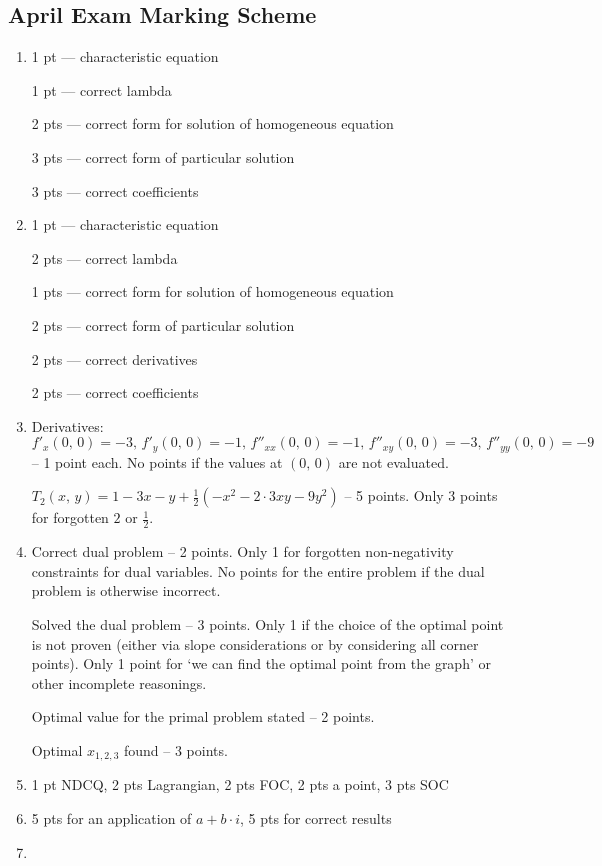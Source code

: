 \subsection{April Exam Marking Scheme}
\begin{enumerate}
  \item %
  1 pt — characteristic equation

  1 pt — correct lambda

  2 pts — correct form for solution of homogeneous equation

  3 pts — correct form of particular solution

  3 pts — correct coefficients 
  \item %
  1 pt — characteristic equation

  2 pts — correct lambda 

  1 pts — correct form for solution of homogeneous equation

  2 pts — correct form of particular solution

  2 pts — correct derivatives
  
  2 pts — correct coefficients
  \item %
      Derivatives: $f'_x(0,\,0)=-3,\,f'_y(0,\,0)=-1,\,f''_{xx}(0,\,0)=-1,\,f''_{xy}(0,\,0)=-3,\,f''_{yy}(0,\,0)=-9$ -- 1 point each. No points if the values at $(0,\,0)$ are not evaluated.
      
      $T_2(x,\,y)=1-3x-y+\frac12(-x^2-2\cdot3xy-9y^2)$ -- 5 points. Only 3 points for forgotten $2$ or $\frac12$.
  \item %
      Correct dual problem -- 2 points. Only 1 for forgotten non-negativity constraints for dual variables. No points for the entire problem if the dual problem is otherwise incorrect.
      
      Solved the dual problem -- 3 points. Only 1 if the choice of the optimal point is not proven (either via slope considerations or by considering all corner points). Only 1 point for `we can find the optimal point from the graph' or other incomplete reasonings.
      
      Optimal value for the primal problem stated -- 2 points.
      
      Optimal $x_{1,2,3}$ found -- 3 points.
  \item %
  1 pt NDCQ, 2 pts Lagrangian, 2 pts FOC, 2 pts a point, 3 pts SOC
  \item %
  5 pts for an application of $a+b \cdot i$, 5 pts for correct results
  \item %
  

\end{enumerate}
